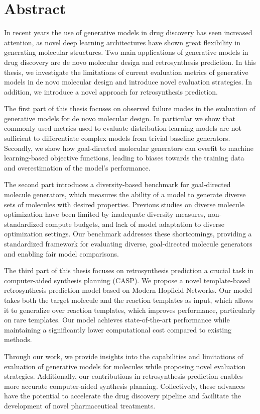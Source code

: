 
{%
\chapter*{Abstract}
In recent years the use of generative models in drug discovery has seen increased attention, as
novel deep learning architectures have shown great flexibility in generating molecular structures.
Two main applications of generative models in drug discovery are de novo molecular design and
retrosynthesis prediction. In this thesis, we investigate the limitations of current evaluation
metrics of generative models in de novo molecular design and introduce novel evaluation strategies.
In addition, we introduce a novel approach for retrosynthesis prediction.

The first part of this thesis focuses on observed failure modes in the evaluation of generative
models for de novo molecular design. In particular we show that commonly used metrics used to
evaluate distribution-learning models are not sufficient to differentiate complex models from trivial
baseline generators. Secondly, we show how goal-directed molecular generators can overfit
to machine learning-based objective functions, leading to biases towards the training data and
overestimation of the model's performance.

The second part introduces a diversity-based benchmark for goal-directed molecule generators,
which measures the ability of a model to generate diverse sets of molecules with desired properties.
Previous studies on diverse molecule optimization have been limited by inadequate diversity
measures, non-standardized compute budgets, and lack of model adaptation to diverse optimization
settings. Our benchmark addresses these shortcomings, providing a standardized framework for
evaluating diverse, goal-directed molecule generators and enabling fair model comparisons.

The third part of this thesis focuses on retrosynthesis prediction a crucial task in computer-aided
synthesis planning (CASP). We propose a novel template-based retrosynthesis prediction model based
on Modern Hopfield Networks. Our model takes both the target molecule and the reaction templates as
input, which allows it to generalize over reaction templates, which improves performance,
particularly on rare templates. Our model achieves state-of-the-art performance while maintaining a
significantly lower computational cost compared to existing methods.

Through our work, we provide insights into the capabilities and limitations of evaluation of
generative models for molecules while proposing novel evaluation strategies. Additionally, our
contributions in retrosynthesis prediction enables more accurate computer-aided synthesis planning.
Collectively, these advances have the potential to accelerate the drug discovery pipeline and
facilitate the development of novel pharmaceutical treatments.
}%